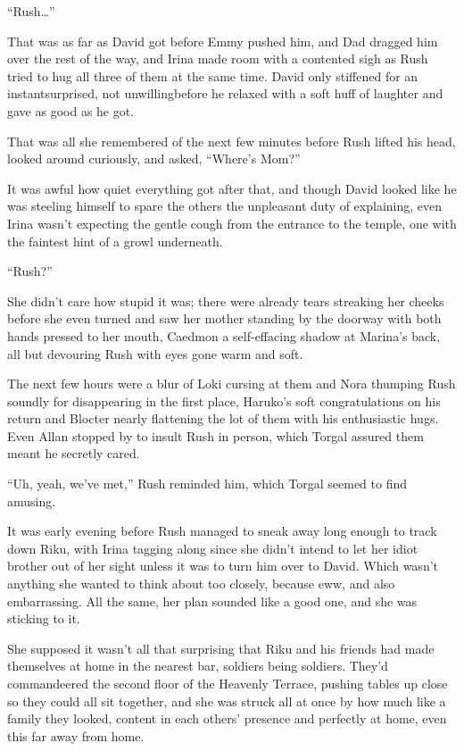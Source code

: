 ``Rush\ldots ''

That was as far as David got before Emmy pushed him, and Dad dragged him over the rest of the way, and Irina made room with a contented sigh as Rush tried to hug all three of them at the same time. David only stiffened for an instant\textemdash surprised, not unwilling\textemdash before he relaxed with a soft huff of laughter and gave as good as he got.

That was all she remembered of the next few minutes before Rush lifted his head, looked around curiously, and asked, ``Where's Mom?''

It was awful how quiet everything got after that, and though David looked like he was steeling himself to spare the others the unpleasant duty of explaining, even Irina wasn't expecting the gentle cough from the entrance to the temple, one with the faintest hint of a growl underneath.

``Rush?''

She didn't care how stupid it was; there were already tears streaking her cheeks before she even turned and saw her mother standing by the doorway with both hands pressed to her mouth, Caedmon a self-effacing shadow at Marina's back, all but devouring Rush with eyes gone warm and soft.

The next few hours were a blur of Loki cursing at them and Nora thumping Rush soundly for disappearing in the first place, Haruko's soft congratulations on his return and Blocter nearly flattening the lot of them with his enthusiastic hugs. Even Allan stopped by to insult Rush in person, which Torgal assured them meant he secretly cared.

``Uh, yeah, we've met,'' Rush reminded him, which Torgal seemed to find amusing.

It was early evening before Rush managed to sneak away long enough to track down Riku, with Irina tagging along since she didn't intend to let her idiot brother out of her sight unless it was to turn him over to David. Which wasn't anything she wanted to think about too closely, because eww, and also embarrassing. All the same, her plan sounded like a good one, and she was sticking to it.

She supposed it wasn't all that surprising that Riku and his friends had made themselves at home in the nearest bar, soldiers being soldiers. They'd commandeered the second floor of the Heavenly Terrace, pushing tables up close so they could all sit together, and she was struck all at once by how much like a family they looked, content in each others' presence and perfectly at home, even this far away from home.

